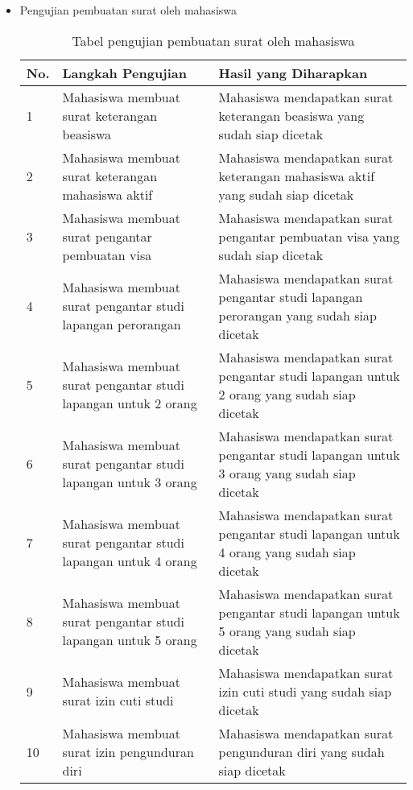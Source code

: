 \begin{itemize}
	\item Pengujian pembuatan surat oleh mahasiswa
	\begin{table}[H]
	\centering
	\caption{Tabel pengujian pembuatan surat oleh mahasiswa}
	\label{pengujian_pembuatan_surat_oleh_mahasiswa}
	\begin{tabular}{|l|p{6cm}|p{6cm}|}
	\hline
	\textbf{No.}&\textbf{Langkah Pengujian}&\textbf{Hasil yang Diharapkan}\\ \hline
	1&Mahasiswa membuat surat keterangan beasiswa&Mahasiswa mendapatkan surat keterangan beasiswa yang sudah siap dicetak\\ \hline
	2&Mahasiswa membuat surat keterangan mahasiswa aktif&Mahasiswa mendapatkan surat keterangan mahasiswa aktif yang sudah siap dicetak\\ \hline
	3&Mahasiswa membuat surat pengantar pembuatan visa&Mahasiswa mendapatkan surat pengantar pembuatan visa yang sudah siap dicetak\\ \hline
	4&Mahasiswa membuat surat pengantar studi lapangan perorangan &Mahasiswa mendapatkan surat pengantar studi lapangan perorangan yang sudah siap dicetak\\ \hline
	5&Mahasiswa membuat surat pengantar studi lapangan untuk 2 orang &Mahasiswa mendapatkan surat pengantar studi lapangan untuk 2 orang yang sudah siap dicetak\\ \hline
	6&Mahasiswa membuat surat pengantar studi lapangan untuk 3 orang &Mahasiswa mendapatkan surat pengantar studi lapangan untuk 3 orang yang sudah siap dicetak\\ \hline
	7&Mahasiswa membuat surat pengantar studi lapangan untuk 4 orang &Mahasiswa mendapatkan surat pengantar studi lapangan untuk 4 orang yang sudah siap dicetak\\ \hline
	8&Mahasiswa membuat surat pengantar studi lapangan untuk 5 orang &Mahasiswa mendapatkan surat pengantar studi lapangan untuk 5 orang yang sudah siap dicetak\\ \hline
	9&Mahasiswa membuat surat izin cuti studi&Mahasiswa mendapatkan surat izin cuti studi yang sudah siap dicetak\\ \hline
	10&Mahasiswa membuat surat izin pengunduran diri&Mahasiswa mendapatkan surat pengunduran diri yang sudah siap dicetak\\ \hline
	\end{tabular}
	\end{table}	
	

\end{itemize}
